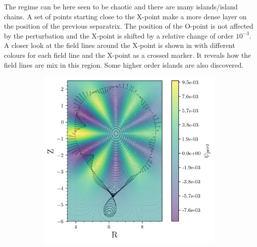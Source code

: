 The regime can be here seen to be chaotic and there are many islands/island chains. A set of points starting close to the X-point make a more dense layer on the position of the previous separatrix. The position of the O-point is not affected by the perturbation and the X-point is shifted by a relative change of order $10^{-3}$. A closer look at the field lines around the X-point is shown in  with different colours for each field line and the X-point as a crossed marker. It reveals how the field lines are mix in this region. Some higher order islands are also discovered. 

\begin{figure}
    \centering
    \begin{subfigure}{0.57\textwidth}
        \centering
        \includegraphics[width=\textwidth]{images/toytok/perturbed-6-1/psi_pert.png}
        \caption{}
        \label{fig:toytok-61-psi}
    \end{subfigure}
    \hfill
    \begin{subfigure}{0.41\textwidth}
        \centering

\end{subfigure}
\end{figure}
